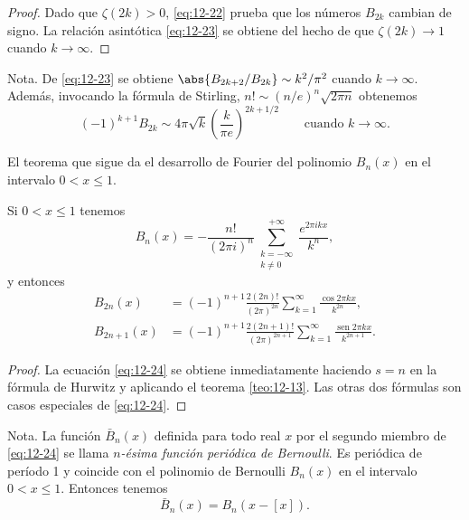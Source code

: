 \documentclass[12pt,a4paper]{book}
\begin{document}
    \begin{proof}
        Dado que $\zeta(2k)>0$, \eqref{eq:12-22} prueba que los números $B_{2k}$ cambian de
        signo. La relación asintótica \eqref{eq:12-23} se obtiene del hecho de que
        $\zeta(2k)\to1$ cuando $k\to\infty$.
    \end{proof}

    Nota. De \eqref{eq:12-23} se obtiene $\abs{B_{2k+2}/B_{2k}}\sim k^{2}/\pi^{2}$ cuando
    $k\to\infty$. Además, invocando la fórmula de Stirling, $n!\sim(n/e)^{n}\sqrt{2\pi n}$
    obtenemos
    \begin{equation*}
        (-1)^{k+1}B_{2k}\sim4\pi\sqrt{k}\left(\frac{k}{\pi e}\right)^{2k+1/2}\qquad\text{cuando }k\to\infty.
    \end{equation*}

    El teorema que sigue da el desarrollo de Fourier del polinomio $B_{n}(x)$ en el intervalo
    $0<x\leq1$.

    \begin{teorema}\label{teo:12-19}
        Si $0<x\leq1$ tenemos
        \begin{equation}\label{eq:12-24}
            B_{n}(x)=-\frac{n!}{(2\pi i)^{n}}\sum_{\substack{k=-\infty\\k\neq0}}^{+\infty}\frac{e^{2\pi ikx}}{k^{n}},
        \end{equation}
        y entonces
        \begin{align*}
            B_{2n}(x)&=(-1)^{n+1}\frac{2(2n)!}{(2\pi)^{2n}}\sum_{k=1}^{\infty}\frac{\cos2\pi kx}{k^{2n}},\\
            B_{2n+1}(x)&=(-1)^{n+1}\frac{2(2n+1)!}{(2\pi)^{2n+1}}\sum_{k=1}^{\infty}\frac{\operatorname{sen}2\pi kx}{k^{2n+1}}.
        \end{align*}
    \end{teorema}

    \begin{proof}
        La ecuación \eqref{eq:12-24} se obtiene inmediatamente haciendo $s=n$ en la fórmula de
        Hurwitz y aplicando el teorema \ref{teo:12-13}. Las otras dos fórmulas son casos
        especiales de \eqref{eq:12-24}.
    \end{proof}

    Nota. La función $\bar{B}_{n}(x)$ definida para todo real $x$ por el segundo miembro de
    \eqref{eq:12-24} se llama \textit{$n$-ésima función periódica de Bernoulli}. Es periódica\label{sim:Bbar}
    de período 1 y coincide con el polinomio de Bernoulli $B_{n}(x)$ en el intervalo
    $0<x\leq1$. Entonces tenemos
    \begin{equation*}
        \bar{B}_{n}(x)=B_{n}(x-[x]).
    \end{equation*}
\end{document}
